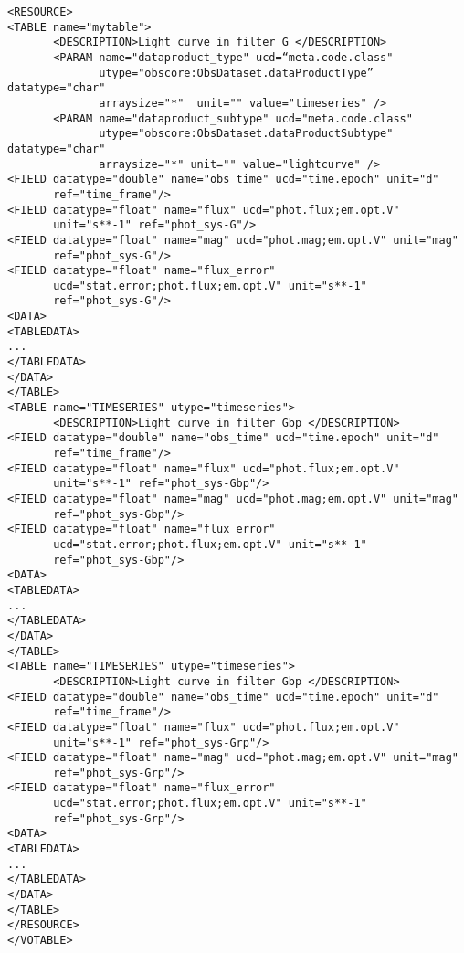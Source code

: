 \begingroup\footnotesize
\begin{tcolorbox}
\begin{verbatim}
<RESOURCE>
<TABLE name="mytable">
       <DESCRIPTION>Light curve in filter G </DESCRIPTION>
       <PARAM name="dataproduct_type" ucd=“meta.code.class" 
              utype="obscore:ObsDataset.dataProductType” datatype="char" 
              arraysize="*"  unit="" value="timeseries" />
       <PARAM name="dataproduct_subtype" ucd="meta.code.class" 
              utype="obscore:ObsDataset.dataProductSubtype" datatype="char" 
              arraysize="*" unit="" value="lightcurve" />
<FIELD datatype="double" name="obs_time" ucd="time.epoch" unit="d" 
       ref="time_frame"/>
<FIELD datatype="float" name="flux" ucd="phot.flux;em.opt.V" 
       unit="s**-1" ref="phot_sys-G"/>
<FIELD datatype="float" name="mag" ucd="phot.mag;em.opt.V" unit="mag"
       ref="phot_sys-G"/>
<FIELD datatype="float" name="flux_error" 
       ucd="stat.error;phot.flux;em.opt.V" unit="s**-1"
       ref="phot_sys-G"/>
<DATA>
<TABLEDATA>
...
</TABLEDATA>
</DATA>
</TABLE>
<TABLE name="TIMESERIES" utype="timeseries">
       <DESCRIPTION>Light curve in filter Gbp </DESCRIPTION>
<FIELD datatype="double" name="obs_time" ucd="time.epoch" unit="d" 
       ref="time_frame"/>
<FIELD datatype="float" name="flux" ucd="phot.flux;em.opt.V" 
       unit="s**-1" ref="phot_sys-Gbp"/>
<FIELD datatype="float" name="mag" ucd="phot.mag;em.opt.V" unit="mag"
       ref="phot_sys-Gbp"/>
<FIELD datatype="float" name="flux_error" 
       ucd="stat.error;phot.flux;em.opt.V" unit="s**-1"
       ref="phot_sys-Gbp"/>
<DATA>
<TABLEDATA>
...
</TABLEDATA>
</DATA>
</TABLE>
<TABLE name="TIMESERIES" utype="timeseries">
       <DESCRIPTION>Light curve in filter Gbp </DESCRIPTION>
<FIELD datatype="double" name="obs_time" ucd="time.epoch" unit="d" 
       ref="time_frame"/>
<FIELD datatype="float" name="flux" ucd="phot.flux;em.opt.V" 
       unit="s**-1" ref="phot_sys-Grp"/>
<FIELD datatype="float" name="mag" ucd="phot.mag;em.opt.V" unit="mag"
       ref="phot_sys-Grp"/>
<FIELD datatype="float" name="flux_error" 
       ucd="stat.error;phot.flux;em.opt.V" unit="s**-1"
       ref="phot_sys-Grp"/>
<DATA>
<TABLEDATA>
...
</TABLEDATA>
</DATA>
</TABLE>
</RESOURCE>
</VOTABLE>
\end{verbatim}
\end{tcolorbox}
\endgroup
